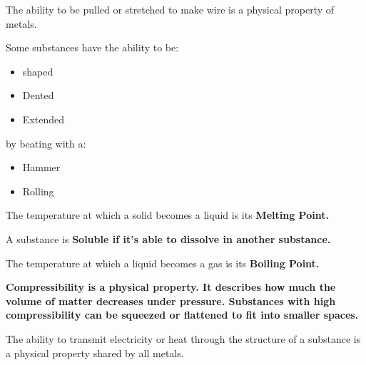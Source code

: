 \begin{definition}[Ductility]
    The ability to be pulled or stretched to make wire is a physical property of
    metals.
\end{definition}

\begin{definition}[Malleability]
    Some substances have the ability to be:
    
    \begin{itemize}
        \item shaped
        \item Dented
        \item Extended
    \end{itemize}

    by beating with a:
    
    \begin{itemize}
        \item Hammer
        \item Rolling
    \end{itemize}
\end{definition}

\begin{definition}
    The temperature at which a solid becomes a liquid is its \bf{Melting Point}.
\end{definition}

\begin{definition}[Solubility]
    A substance is \bf{Soluble} if it's able to dissolve in another substance.
\end{definition}

\begin{definition}
    The temperature at which a liquid becomes a gas is its \bf{Boiling Point}.
\end{definition}

\begin{definition}[Compressibility]
    \bf{Compressibility} is a physical property. It describes how much the
    volume of matter decreases under pressure. Substances with high
    compressibility can be squeezed or flattened to fit into smaller spaces.
\end{definition}

\begin{definition}
    The ability to transmit electricity or heat through the structure of a
    substance is a physical property shared by all metals.
\end{definition}

